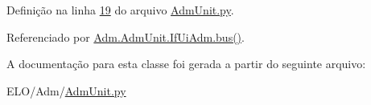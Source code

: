 Definição na linha \hyperlink{AdmUnit_8py_source_l00019}{19} do arquivo \hyperlink{AdmUnit_8py_source}{Adm\-Unit.\-py}.



Referenciado por \hyperlink{classAdm_1_1AdmUnit_1_1IfUiAdm_a4863c3ebab6e5fac647ab32415153470}{Adm.\-Adm\-Unit.\-If\-Ui\-Adm.\-bus()}.



A documentação para esta classe foi gerada a partir do seguinte arquivo\-:\begin{DoxyCompactItemize}
\item 
E\-L\-O/\-Adm/\hyperlink{AdmUnit_8py}{Adm\-Unit.\-py}\end{DoxyCompactItemize}
